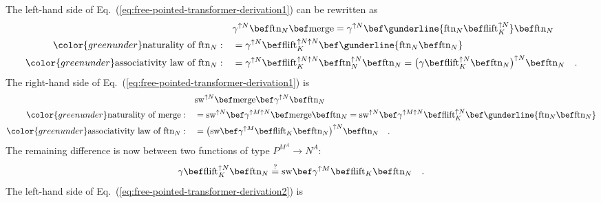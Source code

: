 The left-hand side of Eq.~(\ref{eq:free-pointed-transformer-derivation1})
can be rewritten as
\begin{align*}
 & \gamma^{\uparrow N}\bef\text{ftn}_{N}\bef\text{merge}=\gamma^{\uparrow N}\bef\gunderline{\text{ftn}_{N}\bef\text{flift}_{K}^{\uparrow N}}\bef\text{ftn}_{N}\\
{\color{greenunder}\text{naturality of }\text{ftn}_{N}:}\quad & =\gamma^{\uparrow N}\bef\text{flift}_{K}^{\uparrow N\uparrow N}\bef\gunderline{\text{ftn}_{N}\bef\text{ftn}_{N}}\\
{\color{greenunder}\text{associativity law of }\text{ftn}_{N}:}\quad & =\gamma^{\uparrow N}\bef\text{flift}_{K}^{\uparrow N\uparrow N}\bef\text{ftn}_{N}^{\uparrow N}\bef\text{ftn}_{N}=\big(\gamma\bef\text{flift}_{K}^{\uparrow N}\bef\text{ftn}_{N}\big)^{\uparrow N}\bef\text{ftn}_{N}\quad.
\end{align*}
The right-hand side of Eq.~(\ref{eq:free-pointed-transformer-derivation1})
is
\begin{align*}
 & \text{sw}^{\uparrow N}\bef\text{merge}\bef\gamma^{\uparrow N}\bef\text{ftn}_{N}\\
{\color{greenunder}\text{naturality of }\text{merge}:}\quad & =\text{sw}^{\uparrow N}\bef\gamma^{\uparrow M\uparrow N}\bef\text{merge}\bef\text{ftn}_{N}=\text{sw}^{\uparrow N}\bef\gamma^{\uparrow M\uparrow N}\bef\text{flift}_{K}^{\uparrow N}\bef\gunderline{\text{ftn}_{N}\bef\text{ftn}_{N}}\\
{\color{greenunder}\text{associativity law of }\text{ftn}_{N}:}\quad & =\big(\text{sw}\bef\gamma^{\uparrow M}\bef\text{flift}_{K}\bef\text{ftn}_{N}\big)^{\uparrow N}\bef\text{ftn}_{N}\quad.
\end{align*}
The remaining difference is now between two functions of type $P^{M^{A}}\rightarrow N^{A}$:
\begin{equation}
\gamma\bef\text{flift}_{K}^{\uparrow N}\bef\text{ftn}_{N}\overset{?}{=}\text{sw}\bef\gamma^{\uparrow M}\bef\text{flift}_{K}\bef\text{ftn}_{N}\quad.\label{eq:free-pointed-transformer-derivation2}
\end{equation}
The left-hand side of Eq.~(\ref{eq:free-pointed-transformer-derivation2})
is 
